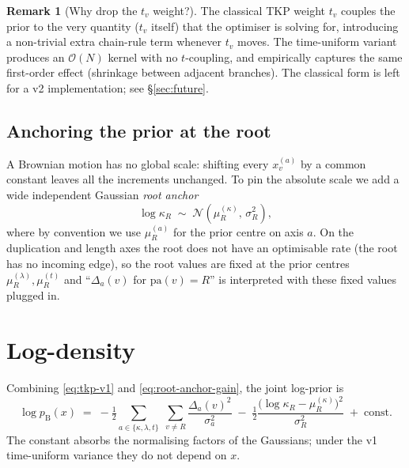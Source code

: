 \documentclass[11pt]{article}
\newcommand{\pa}{\mathrm{pa}}
\newcommand{\troot}{R}
\newcommand{\rate}{\kappa}             %
\newcommand{\dup}{\lambda}             %
\newcommand{\loss}{\mu}                %
\newcommand{\edgelen}{t}               %
\theoremstyle{definition}
\newtheorem{remark}[theorem]{Remark}
\begin{document}
\begin{remark}[Why drop the $\edgelen_v$ weight?]\label{rem:why-tu}
The classical TKP weight $\edgelen_v$ couples the prior to the very
quantity ($\edgelen_v$ itself) that the optimiser is solving for,
introducing a non-trivial extra chain-rule term whenever
$\edgelen_v$ moves.  The time-uniform variant produces an
$\mathcal{O}(N)$ kernel with no $\edgelen$-coupling, and empirically
captures the same first-order effect (shrinkage between adjacent
branches). The classical form is left for a v2 implementation; see
\S\ref{sec:future}.
\end{remark}

\subsection{Anchoring the prior at the root}

A Brownian motion has no global scale: shifting every $x^{(a)}_v$ by
a common constant leaves all the increments unchanged.  To pin the
absolute scale we add a wide independent Gaussian \emph{root anchor}
\begin{equation}
\log\rate_\troot \;\sim\; \mathcal{N}(\loss^{(\rate)}_\troot,\,
\sigma_\troot^2),
\label{eq:root-anchor-gain}
\end{equation}
where by convention we use $\loss^{(a)}_\troot$ for the prior centre
on axis $a$.  On the duplication and length axes the root does not
have an optimisable rate (the root has no incoming edge), so the
root values are fixed at the prior centres
$\loss^{(\dup)}_\troot, \loss^{(\edgelen)}_\troot$ and
``$\Delta_a(v)$ for $\pa(v)=\troot$'' is interpreted with these
fixed values plugged in.

\section{Log-density}
\label{sec:density}

Combining \eqref{eq:tkp-v1} and \eqref{eq:root-anchor-gain}, the
joint log-prior is
\begin{equation}
\boxed{\;
\log p_{\mathrm{B}}(x)
\;=\;
- \tfrac{1}{2}\sum_{a\in\{\rate,\dup,\edgelen\}}\;
   \sum_{v\neq\troot}
      \frac{\Delta_a(v)^2}{\sigma_a^2}
\;-\;
\tfrac{1}{2}\frac{\bigl(\log\rate_\troot - \loss^{(\rate)}_\troot\bigr)^2}
                 {\sigma_\troot^2}
\;+\; \mathrm{const}.
\;}
\label{eq:logprior-final}
\end{equation}
The constant absorbs the normalising factors of the Gaussians; under
the v1 time-uniform variance they do not depend on $x$.
\end{document}
